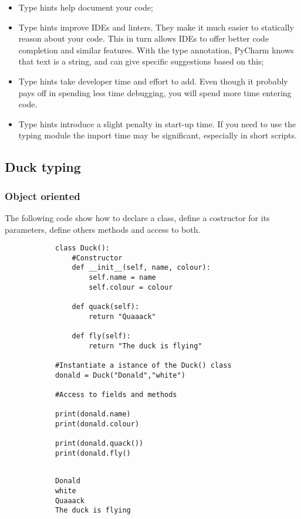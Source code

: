 \documentclass[12pt]{article}
\begin{document}
		\begin{itemize}
			\item Type hints help document your code;
			\item Type hints improve IDEs and linters. They make it much easier to statically reason about your code. This in turn allows IDEs to offer better code completion and similar features. With the type annotation, PyCharm knows that text is a string, and can give specific suggestions based on this;
			\item Type hints take developer time and effort to add. Even though it probably pays off in spending less time debugging, you will spend more time entering code.
			\item Type hints introduce a slight penalty in start-up time. If you need to use the typing module the import time may be significant, especially in short scripts.	
		\end{itemize}
		
		
				
	\subsection{Duck typing}
	
		\subsubsection{Object oriented}
		
		The following code show how to declare a class, define a costructor for its parameters, define others methods and access to both.
		
		\begin{lstlisting}
			class Duck():
				#Constructor 
				def __init__(self, name, colour):
					self.name = name
					self.colour = colour
				
				def quack(self):
					return "Quaaack"
				
				def fly(self):
					return "The duck is flying"
			
			#Instantiate a istance of the Duck() class
			donald = Duck("Donald","white")
			
			#Access to fields and methods
			
			print(donald.name)
			print(donald.colour)
			
			print(donald.quack())
			print(donald.fly()
			
		\end{lstlisting}
		
		\begin{lstlisting}
			Donald
			white
			Quaaack
			The duck is flying
		\end{lstlisting}
		
\end{document}
